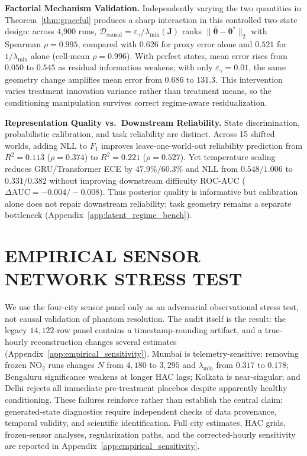 \documentclass[twoside]{article}
\theoremstyle{definition}
\begin{document}
\textbf{Factorial Mechanism Validation.} Independently varying the two quantities in Theorem~\ref{thm:graceful} produces a sharp interaction in this controlled two-state design: across 4,900 runs, $\mathcal D_{\mathrm{causal}}=\varepsilon_\gamma/\lambda_{\min}(\boldsymbol J)$ ranks $\|\hat{\boldsymbol\theta}-\boldsymbol\theta^*\|_2$ with Spearman $\rho=0.995$, compared with $0.626$ for proxy error alone and $0.521$ for $1/\lambda_{\min}$ alone (cell-mean $\rho=0.996$). With perfect states, mean error rises from $0.050$ to $0.545$ as residual information weakens; with only $\varepsilon_\gamma=0.01$, the same geometry change amplifies mean error from $0.686$ to $131.3$. This intervention varies treatment innovation variance rather than treatment means, so the conditioning manipulation survives correct regime-aware residualization.

\textbf{Representation Quality vs.\ Downstream Reliability.} State discrimination, probabilistic calibration, and task reliability are distinct. Across 15 shifted worlds, adding NLL to $F_1$ improves leave-one-world-out reliability prediction from $R^2=0.113$ ($\rho=0.374$) to $R^2=0.221$ ($\rho=0.527$). Yet temperature scaling reduces GRU/Transformer ECE by $47.9\%/60.3\%$ and NLL from $0.548/1.006$ to $0.331/0.382$ without improving downstream difficulty ROC-AUC ($\Delta\mathrm{AUC}=-0.004/-0.008$). Thus posterior quality is informative but calibration alone does not repair downstream reliability; task geometry remains a separate bottleneck (Appendix~\ref{app:latent_regime_bench}).

\vspace{-3mm}
\section{EMPIRICAL SENSOR NETWORK STRESS TEST}
\label{sec:empirical}
We use the four-city sensor panel only as an adversarial observational stress test, not causal validation of phantom resolution. The audit itself is the result: the legacy $14{,}122$-row panel contains a timestamp-rounding artifact, and a true-hourly reconstruction changes several estimates (Appendix~\ref{app:empirical_sensitivity}). Mumbai is telemetry-sensitive: removing frozen $\mathrm{NO}_2$ runs changes $N$ from $4{,}180$ to $3{,}295$ and $\lambda_{\min}$ from $0.317$ to $0.178$; Bengaluru significance weakens at longer HAC lags; Kolkata is near-singular; and Delhi rejects all immediate pre-treatment placebos despite apparently healthy conditioning. These failures reinforce rather than establish the central claim: generated-state diagnostics require independent checks of data provenance, temporal validity, and scientific identification. Full city estimates, HAC grids, frozen-sensor analyses, regularization paths, and the corrected-hourly sensitivity are reported in Appendix~\ref{app:empirical_sensitivity}.
\end{document}
